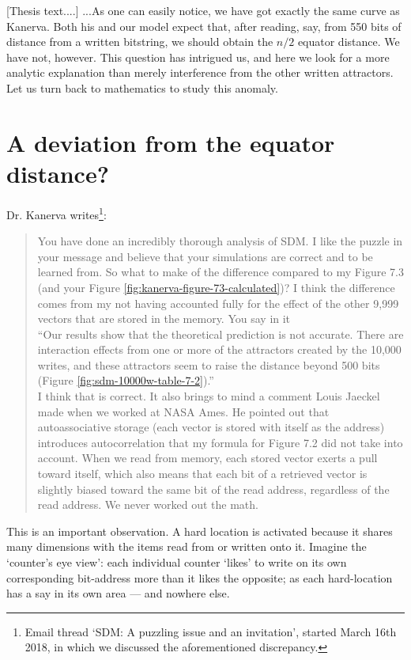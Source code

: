 \documentclass[12pt]{article}
\begin{document}
[Thesis text....] ...As one can easily notice, we have got exactly the same curve as Kanerva. Both his and our model expect that, after reading, say, from 550 bits of distance from a written bitstring, we should obtain the $n/2$ equator distance. We have not, however.  This question has intrigued us, and here we look for a more analytic explanation than merely interference from the other written attractors. Let us turn back to mathematics to study this anomaly.

\section{A deviation from the equator distance?}

Dr. Kanerva writes\footnote{Email thread `SDM: A puzzling issue and an invitation', started March 16th 2018, in which we discussed the aforementioned discrepancy.}:

\begin{quote}
    You have done an incredibly thorough analysis of SDM. I like the puzzle in your message and believe that your simulations are correct and to be learned from.  So what to make of the difference compared to my Figure 7.3 (and your Figure \ref{fig:kanerva-figure-73-calculated})?  I think the difference comes from my not having accounted fully for the effect of the other 9,999 vectors that are stored in the memory.  You say in it\\

   ``Our results show that the theoretical prediction is not accurate. There are interaction effects from one or more of the attractors created by the 10,000 writes, and these attractors seem to raise the distance beyond 500 bits (Figure \ref{fig:sdm-10000w-table-7-2}).'' \\

   I think that is correct.  It also brings to mind a comment Louis Jaeckel made when we worked at NASA Ames.  He pointed out that autoassociative storage (each vector is stored with itself as the address) introduces autocorrelation that my formula for Figure 7.2 did not take into account.  When we read from memory, each stored vector exerts a pull toward itself, which also means that each bit of a retrieved vector is slightly biased toward the same bit of the read address, regardless of the read address.  We never worked out the math.
\end{quote}

This is an important observation. A hard location is activated because it shares many dimensions with the items read from or written onto it. Imagine the `counter's eye view':  each individual counter `likes' to write on its own corresponding bit-address more than it likes the opposite; as each hard-location has a say in its own area --- and nowhere else.
\end{document}
